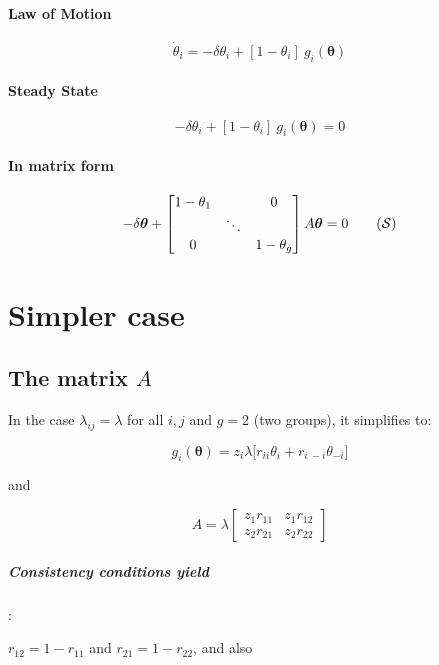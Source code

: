 \documentclass[12pt]{article}
\begin{document}
\paragraph{Law of Motion}
\[
\dot{\theta}_i = - \delta \theta_i + [1-\theta_i] \   g_i(\bm{\theta})
\]

\paragraph{Steady State}

\[
 - \delta \theta_i + [1-\theta_i] \   g_i(\bm{\theta}) = 0
\]

\paragraph{In matrix form}

\[ -\delta \bm{\theta} + \begin{bmatrix} 1- \theta_1 & & 0 \\  & \ddots & \\ 0 & & 1-\theta_g \end{bmatrix} A \bm{\theta} = 0
\label{eq:syst}
\tag{$\mathcal{S}$}
 \]













\section{Simpler case}

\subsection{The matrix $A$}

In the case $\lambda_{ij}=\lambda$ for all $i,j$ and $g=2$ (two groups), it simplifies to:

\[ g_i(\bm{\theta}) = z_i \lambda \Big[ r_{ii} \theta_i + r_{i\ -i} \theta_{-i}  \Big] \] 

and 

\[ A = \lambda \begin{bmatrix} z_1 r_{11} & z_1 r_{12} \\ z_2 r_{21} & z_2 r_{22}  \end{bmatrix} \]

\subparagraph{Consistency conditions yield}:

$r_{12} = 1-r_{11}$ and $r_{21}=1-r_{22}$, and also 
\end{document}
